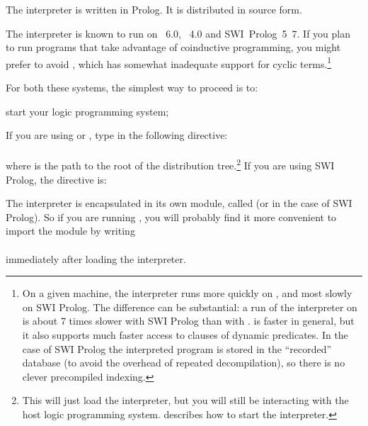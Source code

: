 

%

The interpreter is written in Prolog.  It is distributed in source
form.%

The interpreter is known to run on \Eclipse{}~6.0, \Sicstus{}~4.0 and
SWI~Prolog~5~7.  If you plan to run programs that take advantage of
coinductive programming, you might prefer to avoid \Eclipse{}, which has
somewhat inadequate support for cyclic terms.\footnote{
  On a given machine, the interpreter runs more quickly on \Sicstus{}, and
  most slowly on SWI Prolog.  The difference can be substantial: a run of the
  interpreter on  is about 7 times slower
  with SWI Prolog than with \Sicstus{}.  \Sicstus{} is faster in general, but
  it also supports much faster access to clauses of dynamic predicates.  In
  the case of SWI Prolog the interpreted program is stored in the
  ``recorded'' database (to avoid the overhead of repeated decompilation), so
  there is no clever precompiled indexing.}

For both these systems, the simplest way to proceed is to:
\begin{Enumerate}
\item
  start your logic programming system;
\item
  If you are using \Eclipse{} or \Sicstus{}, type in the following directive:\\
  \ind{}\\
  where  is the path to the root of the distribution
  tree.\footnote{
    This will just load the interpreter, but you will still be interacting
    with the host logic programming system.  
    describes how to start the interpreter.}
  If you are using SWI Prolog, the directive is:\\
  \ind{}
\end{Enumerate}

The interpreter is encapsulated in its own module, called  (or
 in the case of SWI Prolog).  So if
you are running \Eclipse{}, you will probably find it more convenient to import
the module by writing\\
\ind{}\label{import-dra}\\
immediately after loading the interpreter.

